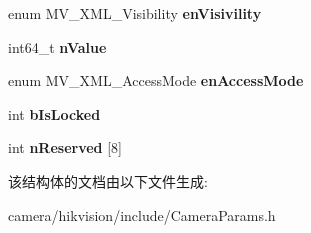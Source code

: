 \begin{DoxyCompactItemize}
\item 
\mbox{\label{struct___m_v___x_m_l___f_e_a_t_u_r_e___enum_entry___a715509bc5e33875847e035e8db3b5d72}} 
enum M\+V\+\_\+\+X\+M\+L\+\_\+\+Visibility {\bfseries en\+Visivility}
\item 
\mbox{\label{struct___m_v___x_m_l___f_e_a_t_u_r_e___enum_entry___ac06d3cb43097d10726f8459988fd976b}} 
int64\+\_\+t {\bfseries n\+Value}
\item 
\mbox{\label{struct___m_v___x_m_l___f_e_a_t_u_r_e___enum_entry___aedf5f9ec13b82975de7aea625e79de27}} 
enum M\+V\+\_\+\+X\+M\+L\+\_\+\+Access\+Mode {\bfseries en\+Access\+Mode}
\item 
\mbox{\label{struct___m_v___x_m_l___f_e_a_t_u_r_e___enum_entry___a6607623c390797adef3e09d5111d940a}} 
int {\bfseries b\+Is\+Locked}
\item 
\mbox{\label{struct___m_v___x_m_l___f_e_a_t_u_r_e___enum_entry___a5511a1b4e79a50e72878687cfa9d815b}} 
int {\bfseries n\+Reserved} \mbox{[}8\mbox{]}
\end{DoxyCompactItemize}


该结构体的文档由以下文件生成\+:\begin{DoxyCompactItemize}
\item 
camera/hikvision/include/Camera\+Params.\+h\end{DoxyCompactItemize}
